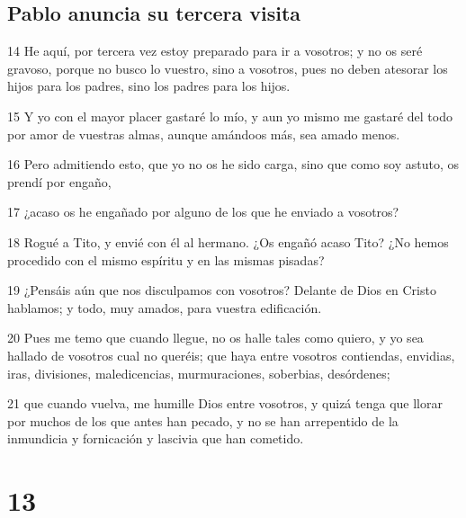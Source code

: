 \section*{Pablo anuncia su tercera visita}

\par 14 He aquí, por tercera vez estoy preparado para ir a vosotros; y no os seré gravoso, porque no busco lo vuestro, sino a vosotros, pues no deben atesorar los hijos para los padres, sino los padres para los hijos.
\par 15 Y yo con el mayor placer gastaré lo mío, y aun yo mismo me gastaré del todo por amor de vuestras almas, aunque amándoos más, sea amado menos.
\par 16 Pero admitiendo esto, que yo no os he sido carga, sino que como soy astuto, os prendí por engaño,
\par 17 ¿acaso os he engañado por alguno de los que he enviado a vosotros?
\par 18 Rogué a Tito, y envié con él al hermano. ¿Os engañó acaso Tito? ¿No hemos procedido con el mismo espíritu y en las mismas pisadas?
\par 19 ¿Pensáis aún que nos disculpamos con vosotros? Delante de Dios en Cristo hablamos; y todo, muy amados, para vuestra edificación.
\par 20 Pues me temo que cuando llegue, no os halle tales como quiero, y yo sea hallado de vosotros cual no queréis; que haya entre vosotros contiendas, envidias, iras, divisiones, maledicencias, murmuraciones, soberbias, desórdenes;
\par 21 que cuando vuelva, me humille Dios entre vosotros, y quizá tenga que llorar por muchos de los que antes han pecado, y no se han arrepentido de la inmundicia y fornicación y lascivia que han cometido.

\chapter{13}

